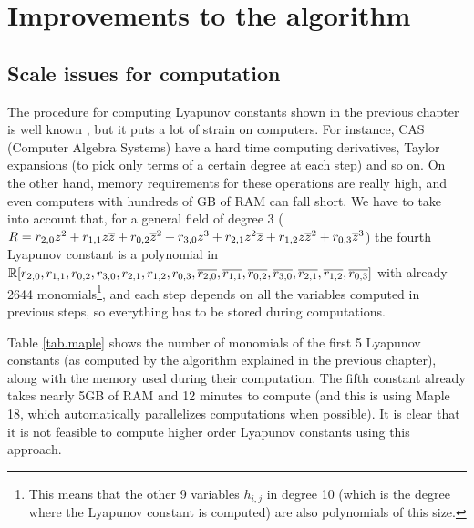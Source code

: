 
\chapter{Improvements to the algorithm}


\section{Scale issues for computation}

The procedure for computing Lyapunov constants shown in the previous chapter is well known \parencite{Christopher2006,Songling1981,Songling1984}, but it puts a lot of strain on computers. For instance, CAS (Computer Algebra Systems) have a hard time computing derivatives, Taylor expansions (to pick only terms of a certain degree at each step) and so on. On the other hand, memory requirements for these operations are really high, and even computers with hundreds of GB of RAM can fall short. We have to take into account that, for a general field of degree 3 ($R=r_{2,0}z^2+r_{1,1}z\overline{z}+r_{0,2}\overline{z}^2+r_{3,0}z^3+r_{2,1}z^2\overline{z}+r_{1,2}z\overline{z}^2+r_{0,3}\overline{z}^3$) the fourth Lyapunov constant is a polynomial in $\mathbb{R}[r_{2,0},r_{1,1},r_{0,2},r_{3,0},r_{2,1},r_{1,2},r_{0,3},\overline{r_{2,0}},\overline{r_{1,1}},\overline{r_{0,2}},\overline{r_{3,0}},\overline{r_{2,1}},\overline{r_{1,2}},\overline{r_{0,3}}]$ with already 2644 monomials\footnote{This means that the other 9 variables $h_{i,j}$ in degree 10 (which is the degree where the  Lyapunov constant is computed) are also polynomials of this size.}, and each step depends on all the variables computed in previous steps, so everything has to be stored during computations.

Table \ref{tab.maple} shows the number of monomials of the first 5 Lyapunov constants (as computed by the algorithm explained in the previous chapter), along with the memory used during their computation. The fifth constant already takes nearly 5GB of RAM and 12 minutes to compute (and this is using Maple 18, which automatically parallelizes computations when possible). It is clear that it is not feasible to compute higher order Lyapunov constants using this approach.

